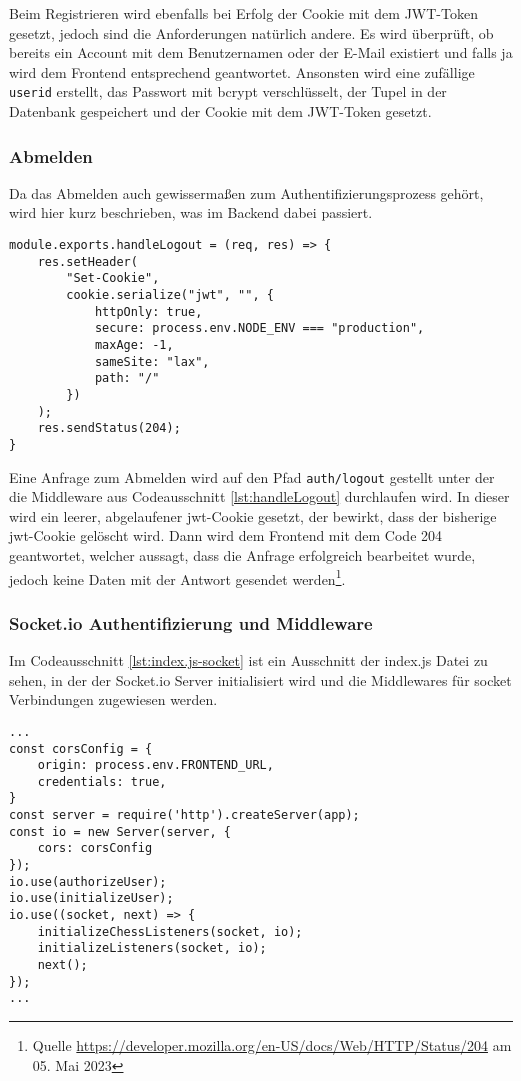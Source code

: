 Beim Registrieren wird ebenfalls bei Erfolg der Cookie mit dem JWT-Token gesetzt, jedoch sind die Anforderungen natürlich andere. Es wird überprüft, ob bereits ein Account mit dem Benutzernamen oder der E-Mail existiert und falls ja wird dem Frontend entsprechend geantwortet. Ansonsten wird eine zufällige \verb|userid| erstellt, das Passwort mit bcrypt verschlüsselt, der Tupel in der Datenbank gespeichert und der Cookie mit dem JWT-Token gesetzt.

\subsubsection{Abmelden}
Da das Abmelden auch gewissermaßen zum Authentifizierungsprozess gehört, wird hier kurz beschrieben, was im Backend dabei passiert.

\begin{lstlisting}[style=codeStyle, caption={Middleware zum Abmelden}, label={lst:handleLogout}]
module.exports.handleLogout = (req, res) => {
    res.setHeader(
        "Set-Cookie",
        cookie.serialize("jwt", "", {
            httpOnly: true,
            secure: process.env.NODE_ENV === "production",
            maxAge: -1,
            sameSite: "lax",
            path: "/"
        })
    );
    res.sendStatus(204);
}
\end{lstlisting}

Eine Anfrage zum Abmelden wird auf den Pfad \verb|auth/logout| gestellt unter der die Middleware aus Codeausschnitt \ref{lst:handleLogout} durchlaufen wird. In dieser wird ein leerer, abgelaufener \glqq jwt\grqq  -Cookie gesetzt, der bewirkt, dass der bisherige \glqq jwt\grqq -Cookie gelöscht wird. Dann wird dem Frontend mit dem Code 204 geantwortet, welcher aussagt, dass die Anfrage erfolgreich bearbeitet wurde, jedoch keine Daten mit der Antwort gesendet werden\footnote{Quelle \url{https://developer.mozilla.org/en-US/docs/Web/HTTP/Status/204} am 05. Mai 2023}.

\subsubsection{Socket.io Authentifizierung und Middleware}
\label{sec:Backend-Socket}
Im Codeausschnitt \ref{lst:index.js-socket} ist ein Ausschnitt der index.js Datei zu sehen, in der der Socket.io Server initialisiert wird und die Middlewares für socket Verbindungen zugewiesen werden.

\begin{lstlisting}[style=codeStyle, caption={Ausschnitt der index.js Datei mit Socket.io Server Erstellung und Middleware Zuweisung}, label={lst:index.js-socket}]
...
const corsConfig = {
    origin: process.env.FRONTEND_URL,
    credentials: true,
}
const server = require('http').createServer(app);
const io = new Server(server, {
    cors: corsConfig
});
io.use(authorizeUser);
io.use(initializeUser);
io.use((socket, next) => {
    initializeChessListeners(socket, io);
    initializeListeners(socket, io);
    next();
});
...
\end{lstlisting}

